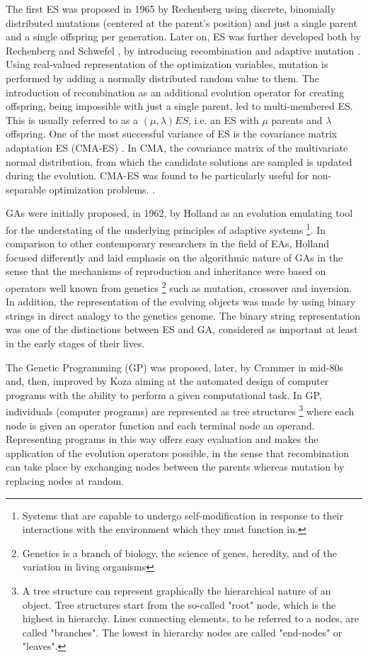 The first ES was proposed in 1965 by Rechenberg \cite{Rechenberg_1965} using discrete, binomially distributed mutations (centered at the parent's position) and just a single parent and a single offspring per generation. Later on, ES was further developed both by Rechenberg \cite{Rechenberg71} and Schwefel \cite{Schwefel75}, by introducing recombination and adaptive mutation \cite{Rechenberg}. Using real-valued representation of the optimization variables, mutation is performed by adding a normally distributed random value to them. The introduction of recombination as an additional evolution operator for creating offspring, being impossible with just a single parent, led to multi-membered ES. This is usually referred to as a $(\mu, \lambda)ES$, i.e. an ES with $\mu$ parents and $\lambda$ offspring. One of the most successful variance of ES is the covariance matrix adaptation ES (CMA-ES) \cite{hansen2003ecj}. In CMA, the covariance matrix of the multivariate normal distribution, from which the candidate solutions are sampled is updated during the evolution. CMA-ES was found to be particularly useful for non-separable optimization problems. \cite{hansen2001ecj,hansen1997ecj}.

GAs were initially proposed, in 1962, by Holland \cite{Holland:1962:OLT:321127.321128,holland_1975} as an evolution emulating tool for the understating of the underlying principles
of adaptive systems \footnote{Systems that are capable to undergo self-modification in response to their interactions with the environment which they must function in.}. In comparison to other contemporary researchers in the field of EAs, Holland focused differently and laid emphasis on the algorithmic nature of GAs in the sense that the mechanisms of reproduction and inheritance were based on operators well known from genetics \footnote{Genetics is a branch of biology, the science of genes, heredity, and of the variation in living organisms} such as mutation, crossover and inversion. In addition, the representation of the evolving objects was made by using binary strings in direct analogy to the genetics genome. The binary string representation was one of the distinctions between ES and GA, considered as important at least in the early stages of their lives.  
 
The Genetic Programming (GP) was proposed, later, by Crammer in mid-80s \cite{cramer85} and, then, improved by Koza \cite{Koz94} aiming at the automated design of computer programs with the ability to perform a given computational task. In GP, individuals (computer programs) are represented as tree structures \footnote{A tree structure can represent graphically the hierarchical nature of an object. Tree structures start from the so-called "root" node, which is the highest in hierarchy. Lines connecting elements, to be referred to a nodes, are called "branches". The lowest in hierarchy nodes are called "end-nodes" or "leaves". } where each node is given an operator function and each terminal node an operand. Representing programs in this way offers easy evaluation and makes the application of the evolution operators possible, in the sense that recombination can take place by exchanging nodes between the parents whereas mutation by replacing nodes at random. 
 

